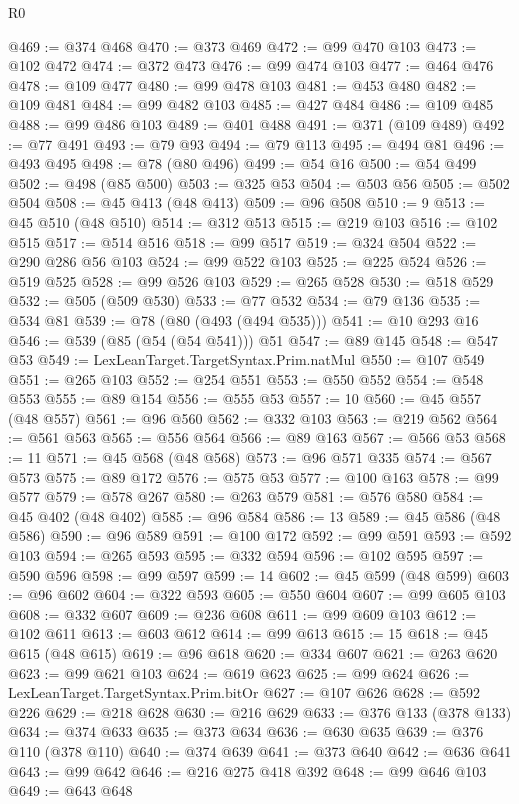\begin{lexlean}{R0}
\begin{coremodule}
@469 := @374 @468
@470 := @373 @469
@472 := @99 @470 @103
@473 := @102 @472
@474 := @372 @473
@476 := @99 @474 @103
@477 := @464 @476
@478 := @109 @477
@480 := @99 @478 @103
@481 := @453 @480
@482 := @109 @481
@484 := @99 @482 @103
@485 := @427 @484
@486 := @109 @485
@488 := @99 @486 @103
@489 := @401 @488
@491 := @371 (@109 @489)
@492 := @77 @491
@493 := @79 @93
@494 := @79 @113
@495 := @494 @81
@496 := @493 @495
@498 := @78 (@80 @496)
@499 := @54 @16
@500 := @54 @499
@502 := @498 (@85 @500)
@503 := @325 @53
@504 := @503 @56
@505 := @502 @504
@508 := @45 @413 (@48 @413)
@509 := @96 @508
@510 := 9
@513 := @45 @510 (@48 @510)
@514 := @312 @513
@515 := @219 @103
@516 := @102 @515
@517 := @514 @516
@518 := @99 @517
@519 := @324 @504
@522 := @290 @286 @56 @103
@524 := @99 @522 @103
@525 := @225 @524
@526 := @519 @525
@528 := @99 @526 @103
@529 := @265 @528
@530 := @518 @529
@532 := @505 (@509 @530)
@533 := @77 @532
@534 := @79 @136
@535 := @534 @81
@539 := @78 (@80 (@493 (@494 @535)))
@541 := @10 @293 @16
@546 := @539 (@85 (@54 (@54 @541))) @51
@547 := @89 @145
@548 := @547 @53
@549 := LexLeanTarget.TargetSyntax.Prim.natMul
@550 := @107 @549
@551 := @265 @103
@552 := @254 @551
@553 := @550 @552
@554 := @548 @553
@555 := @89 @154
@556 := @555 @53
@557 := 10
@560 := @45 @557 (@48 @557)
@561 := @96 @560
@562 := @332 @103
@563 := @219 @562
@564 := @561 @563
@565 := @556 @564
@566 := @89 @163
@567 := @566 @53
@568 := 11
@571 := @45 @568 (@48 @568)
@573 := @96 @571 @335
@574 := @567 @573
@575 := @89 @172
@576 := @575 @53
@577 := @100 @163
@578 := @99 @577
@579 := @578 @267
@580 := @263 @579
@581 := @576 @580
@584 := @45 @402 (@48 @402)
@585 := @96 @584
@586 := 13
@589 := @45 @586 (@48 @586)
@590 := @96 @589
@591 := @100 @172
@592 := @99 @591
@593 := @592 @103
@594 := @265 @593
@595 := @332 @594
@596 := @102 @595
@597 := @590 @596
@598 := @99 @597
@599 := 14
@602 := @45 @599 (@48 @599)
@603 := @96 @602
@604 := @322 @593
@605 := @550 @604
@607 := @99 @605 @103
@608 := @332 @607
@609 := @236 @608
@611 := @99 @609 @103
@612 := @102 @611
@613 := @603 @612
@614 := @99 @613
@615 := 15
@618 := @45 @615 (@48 @615)
@619 := @96 @618
@620 := @334 @607
@621 := @263 @620
@623 := @99 @621 @103
@624 := @619 @623
@625 := @99 @624
@626 := LexLeanTarget.TargetSyntax.Prim.bitOr
@627 := @107 @626
@628 := @592 @226
@629 := @218 @628
@630 := @216 @629
@633 := @376 @133 (@378 @133)
@634 := @374 @633
@635 := @373 @634
@636 := @630 @635
@639 := @376 @110 (@378 @110)
@640 := @374 @639
@641 := @373 @640
@642 := @636 @641
@643 := @99 @642
@646 := @216 @275 @418 @392
@648 := @99 @646 @103
@649 := @643 @648

\end{coremodule}
\end{lexlean}
